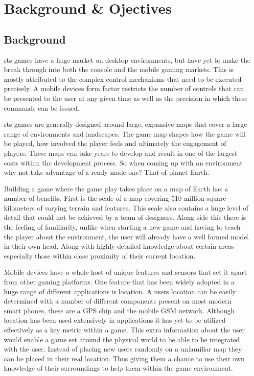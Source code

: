 \chapter{Background \& Ojectives}

\section{Background}
\Gls{rts} games have a huge market on desktop environments, but have yet to make the break through into both the console and the mobile gaming markets. This is mostly attributed to the complex control mechanisms that need to be executed precisely. A mobile devices form factor restricts the number of controls that can be presented to the user at any given time as well as the precision in which these commands can be issued.

\Gls{rts} games are generally designed around large, expansive maps that cover a large range of environments and landscapes. The game map shapes how the game will be played, how involved the player feels and ultimately the engagement of players. These maps can take years to develop and result in one of the largest costs within the development process. So when coming up with an environment why not take advantage of a ready made one? That of planet Earth.

Building a game where the game play takes place on a map of Earth has a number of benefits. First is the scale of a map covering 510 million square kilometers of varying terrain and features. This scale also contains a huge level of detail that could not be achieved by a team of designers. Along side this there is the feeling of familiarity, unlike when starting a new game and having to teach the player about the environment, the user will already have a well formed model in their own head. Along with highly detailed knowledge about certain areas especially those within close proximity of their current location.

Mobile devices have a whole host of unique features and sensors that set it apart from other gaming platforms. One feature that has been widely adopted in a huge range of different applications is location. A users location can be easily determined with a number of different components present on most modern smart phones, these are a GPS chip and the mobile GSM network. Although location has been used extensively in applications it has yet to be utilized effectively as a key metric within a game. This extra information about the user would enable a game set around the physical world to be able to be integrated with the user. Instead of placing new users randomly on a unfamiliar map they can be placed in their real location. Thus giving them a chance to use their own knowledge of their surroundings to help them within the game environment.


